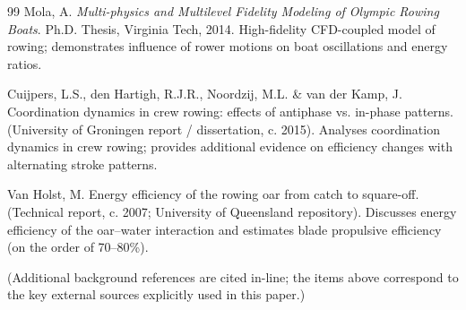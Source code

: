 \documentclass[12pt]{article}
\begin{document}
\begin{thebibliography}{99}
Mola, A.
\textit{Multi-physics and Multilevel Fidelity Modeling of Olympic Rowing Boats}.
Ph.D. Thesis, Virginia Tech, 2014.
High-fidelity CFD-coupled model of rowing; demonstrates influence of rower motions on boat oscillations and energy ratios.

Cuijpers, L.S., den Hartigh, R.J.R., Noordzij, M.L. \& van der Kamp, J.
Coordination dynamics in crew rowing: effects of antiphase vs. in-phase patterns.
(University of Groningen report / dissertation, c. 2015).
Analyses coordination dynamics in crew rowing; provides additional evidence on efficiency changes with alternating stroke patterns.

Van Holst, M.
Energy efficiency of the rowing oar from catch to square-off.
(Technical report, c. 2007; University of Queensland repository).
Discusses energy efficiency of the oar–water interaction and estimates blade propulsive efficiency (on the order of 70–80\%).

\end{thebibliography}

\noindent(Additional background references are cited in-line; the items above correspond to the key external sources explicitly used in this paper.)
\end{document}
